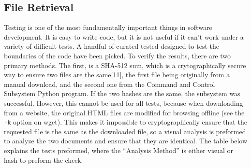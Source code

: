 \documentclass{article}
\begin{document}
\subsection{File Retrieval}
Testing is one of the most fundamentally important things in software
development. It is easy to write code, but it is not useful if it
can't work under a variety of difficult tests. A handful of curated
tested designed to test the boundaries of the code have been
picked. To verify the results, there are two primary methods. The
first, is a SHA-512 sum, which is a crytographically secure way to
ensure two files are the same[11], the first file being originally from a
manual download, and the second one from the Command and Control
Subsystem Python program. If the two hashes are the same, the subsystem was
successful. However, this cannot be used for all
tests, because when downloading from a website, the original HTML files
are modified for browsing offline (see the \texttt{-k} option on
wget). This makes it impossible to cryptographically ensure that the
requested file is the same as the downloaded file, so a visual
analysis is preformed to analyze the two documents and ensure that
they are identical. The table below explains the tests preformed,
where the ``Analysis Method'' is either visual or hash to preform the
check. 
\end{document}
